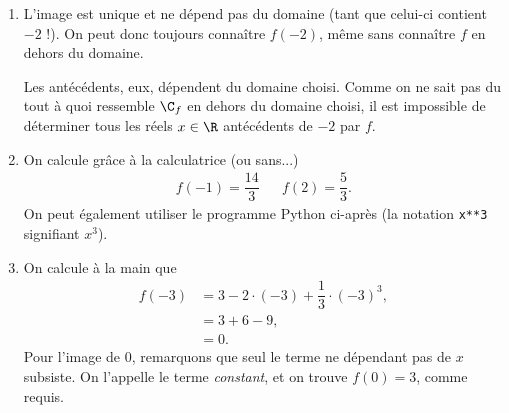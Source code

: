 {\begin{enumerate}
		\item L'image est unique et ne dépend pas du domaine (tant que celui-ci contient $-2$ !).
		On peut donc toujours connaître $f(-2)$, même sans connaître $f$ en dehors du domaine.
		
		Les antécédents, eux, dépendent du domaine choisi.
		Comme on ne sait pas du tout à quoi ressemble $\C_f$ en dehors du domaine choisi, il est impossible de déterminer tous les réels $x\in\R$ antécédents de $-2$ par $f$.
		
		\item On calcule grâce à la calculatrice (ou sans...)
			\begin{align*}
				f(-1) = \dfrac{14}3 && f(2) =  \dfrac53.
			\end{align*}
		On peut également utiliser le programme Python ci-après (la notation \texttt{x**3} signifiant $x^3$).
	
		\begin{center}
		\end{center}
		
		\item On calcule à la main que
			\begin{align*}
				f(-3) &= 3 - 2 \cdot (-3) + \dfrac13 \cdot (-3)^3, \\
					&= 3 + 6 - 9, \\
					&= 0.
			\end{align*}
		Pour l'image de $0$, remarquons que seul le terme ne dépendant pas de $x$ subsiste. 
		On l'appelle le terme \emph{constant}, et on trouve $f(0) = 3$, comme requis.
	\end{enumerate}
}


